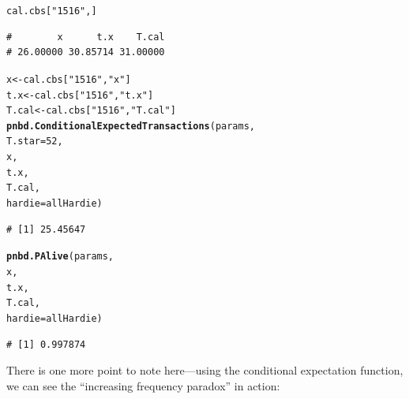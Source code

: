 \documentclass[10pt, letterpaper, onecolumn, oneside, final]{article}\usepackage[]{graphicx}\usepackage[]{color}
\makeatletter
\newcommand{\hlnum}[1]{\textcolor[rgb]{0.686,0.059,0.569}{#1}}%
\newcommand{\hlstr}[1]{\textcolor[rgb]{0.192,0.494,0.8}{#1}}%
\newcommand{\hlstd}[1]{\textcolor[rgb]{0.345,0.345,0.345}{#1}}%
\newcommand{\hlkwb}[1]{\textcolor[rgb]{0.69,0.353,0.396}{#1}}%
\newcommand{\hlkwc}[1]{\textcolor[rgb]{0.333,0.667,0.333}{#1}}%
\newcommand{\hlkwd}[1]{\textcolor[rgb]{0.737,0.353,0.396}{\textbf{#1}}}%
\newenvironment{kframe}{%
 \def\at@end@of@kframe{}%
 \ifinner\ifhmode%
  \def\at@end@of@kframe{\end{minipage}}%
  \begin{minipage}{\columnwidth}%
 \fi\fi%
 \def\FrameCommand##1{\hskip\@totalleftmargin \hskip-\fboxsep
 \colorbox{shadecolor}{##1}\hskip-\fboxsep
     \hskip-\linewidth \hskip-\@totalleftmargin \hskip\columnwidth}%
 \MakeFramed {\advance\hsize-\width
   \@totalleftmargin\z@ \linewidth\hsize
   \@setminipage}}%
 {\par\unskip\endMakeFramed%
 \at@end@of@kframe}
\newenvironment{knitrout}{}{} %
\makeatother
\begin{document}
\begin{knitrout}
\color{fgcolor}\begin{kframe}
\begin{alltt}
\hlstd{cal.cbs[}\hlstr{"1516"}\hlstd{,]}
\end{alltt}
\begin{verbatim}
#        x      t.x    T.cal 
# 26.00000 30.85714 31.00000
\end{verbatim}
\begin{alltt}
\hlstd{x} \hlkwb{<-} \hlstd{cal.cbs[}\hlstr{"1516"}\hlstd{,} \hlstr{"x"}\hlstd{]}
\hlstd{t.x} \hlkwb{<-} \hlstd{cal.cbs[}\hlstr{"1516"}\hlstd{,} \hlstr{"t.x"}\hlstd{]}
\hlstd{T.cal} \hlkwb{<-} \hlstd{cal.cbs[}\hlstr{"1516"}\hlstd{,} \hlstr{"T.cal"}\hlstd{]}
\hlkwd{pnbd.ConditionalExpectedTransactions}\hlstd{(params,}
                                     \hlkwc{T.star} \hlstd{=} \hlnum{52}\hlstd{,}
                                     \hlstd{x,}
                                     \hlstd{t.x,}
                                     \hlstd{T.cal,}
                                     \hlkwc{hardie} \hlstd{= allHardie)}
\end{alltt}
\begin{verbatim}
# [1] 25.45647
\end{verbatim}
\begin{alltt}
\hlkwd{pnbd.PAlive}\hlstd{(params,}
            \hlstd{x,}
            \hlstd{t.x,}
            \hlstd{T.cal,}
            \hlkwc{hardie} \hlstd{= allHardie)}
\end{alltt}
\begin{verbatim}
# [1] 0.997874
\end{verbatim}
\end{kframe}
\end{knitrout}

There is one more point to note here---using the conditional
expectation function, we can see the ``increasing frequency paradox''
in action:
\end{document}
